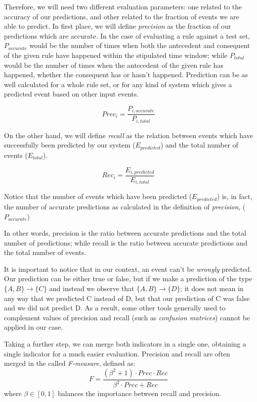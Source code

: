 \documentclass[a4paper,12pt]{article}
\begin{document}
Therefore, we will need two different evaluation parameters: one related to the accuracy of our predictions, and other related to the fraction of events we are able to predict\cite{torgo2003data}. In first place, we will define \emph{precision} as the fraction of our predictions which are accurate. In the case of evaluating a rule against a test set, $P_{accurate}$ would be the number of times when both the antecedent and consequent of the given rule have happened within the stipulated time window; while $P_{total}$ would be the number of times when the antecedent of the given rule has happened, whether the consequent has or hasn't happened. Prediction can be as well calculated for a whole rule set, or for any kind of system which gives a predicted event based on other input events.

\begin{equation}
Prec_i = \dfrac{ P_{i, accurate}}{ P_{i, total} }
\end{equation}

On the other hand, we will define \emph{recall} as the relation between events which have successfully been predicted by our system ($E_{predicted}$) and the total number of events ($E_{total}$). 

\begin{equation}
Rec_i = \dfrac{ E_{i, predicted}}{ E_{i, total} }
\end{equation}

Notice that the number of events which have been predicted ($E_{predicted}$) is, in fact, the number of accurate predictions as calculated in the definition of \emph{precision}, ($P_{accurate}$)

In other words, precision is the ratio between accurate predictions and the total number of predictions; while recall is the ratio between accurate predictions and the total number of events.

It is important to notice that in our context, an event can't be \emph{wrongly} predicted. Our prediction can be either true or false, but if we make a prediction of the type $\{A, B\} \longrightarrow \{C\}$ and instead we observe that $\{A, B\} \longrightarrow \{D\}$; it does not mean in any way that we predicted C instead of D, but that our prediction of C was false and we did not predict D. As a result, some other tools generally used to complement values of precision and recall (such as \emph{confusion matrices}) cannot be applied in our case.

Taking a further step, we can merge both indicators in a single one, obtaining a single indicator for a much easier evaluation. Precision and recall are often merged in the called \emph{F-measure}, defined as:
\begin{equation}
F = \dfrac{(\beta^{2}+1) \cdot Prec \cdot Rec}{\beta^{2} \cdot Prec+Rec}
\end{equation}
where $\beta\in [0,1]$ balances the importance between recall and precision.
\end{document}
